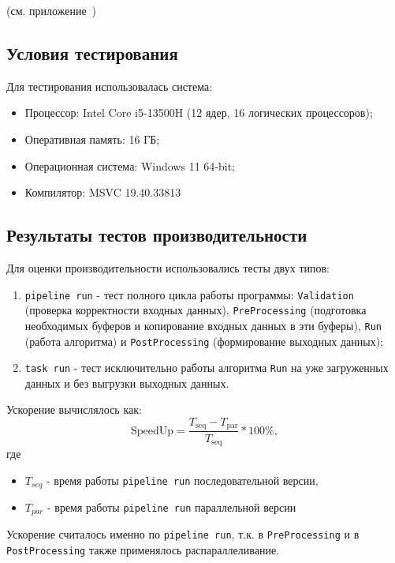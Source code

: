 \documentclass[12pt]{article}
\begin{document}
(см. приложение~)

\subsection{Условия тестирования}
Для тестирования использовалась система:
\begin{itemize}
    \item Процессор: Intel Core i5-13500H (12 ядер, 16 логических процессоров);
    \item Оперативная память: 16 ГБ;
    \item Операционная система: Windows 11 64-bit;  
    \item Компилятор: MSVC 19.40.33813
\end{itemize}

\subsection{Результаты тестов производительности}

Для оценки производительности использовались тесты двух типов:
\begin{enumerate}
    \item \texttt{pipeline run} - тест полного цикла работы программы: \texttt{Validation} (проверка корректности входных данных), \texttt{PreProcessing} (подготовка необходимых буферов и копирование входных данных в эти буферы), \texttt{Run} (работа алгоритма) и \texttt{PostProcessing} (формирование выходных данных);
    \item \texttt{task run} - тест исключительно работы алгоритма \texttt{Run} на уже загруженных данных и без выгрузки выходных данных.
\end{enumerate}

Ускорение вычислялось как:
\[
\text{SpeedUp} = \frac{T_{\text{seq}} - T_{\text{par}}}{T_{\text{seq}}} * 100\%,
\]
где
\begin{itemize}
    \item \(T_{seq}\) - время работы \texttt{pipeline run} последовательной версии,
    \item \(T_{par}\) - время работы \texttt{pipeline run} параллельной версии
\end{itemize}

Ускорение считалось именно по \texttt{pipeline run}, т.к. в \texttt{PreProcessing} и в \texttt{PostProcessing} также применялось распараллеливание.
\end{document}

